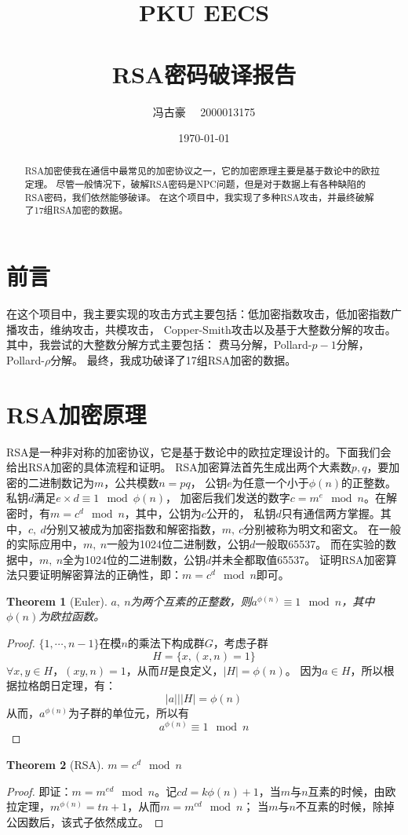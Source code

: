 \documentclass{ctexart}
\title{	
\normalfont \normalsize 
\textsc{PKU EECS} \\
\horrule{0.5pt} \\[0.4cm] 
\huge RSA密码破译报告
\horrule{2pt} \\[0.5cm] 
}
\author{冯古豪 \ \ 2000013175}
\date{\today}
\newtheorem{theorem}{Theorem}
\begin{document}
\maketitle
\newpage
\tableofcontents
\newpage

\begin{abstract}
    RSA加密使我在通信中最常见的加密协议之一，它的加密原理主要是基于数论中的欧拉定理。
    尽管一般情况下，破解RSA密码是NPC问题，但是对于数据上有各种缺陷的RSA密码，我们依然能够破译。
    在这个项目中，我实现了多种RSA攻击，并最终破解了17组RSA加密的数据。
\end{abstract}

\section{前言}\label{section-introduction}
在这个项目中，我主要实现的攻击方式主要包括：低加密指数攻击，低加密指数广播攻击，维纳攻击，共模攻击，
Copper-Smith攻击以及基于大整数分解的攻击。其中，我尝试的大整数分解方式主要包括：
费马分解，Pollard-$p-1$分解，Pollard-$\rho$分解。
最终，我成功破译了17组RSA加密的数据。
\section{RSA加密原理}
RSA是一种非对称的加密协议，它是基于数论中的欧拉定理设计的。下面我们会给出RSA加密的具体流程和证明。
RSA加密算法首先生成出两个大素数$p,q$，要加密的二进制数记为$m$，公共模数$n=pq$，
公钥$e$为任意一个小于$\phi(n)$的正整数。私钥$d$满足$e\times d\equiv 1 \mod{\phi(n)}$，
加密后我们发送的数字$c=m^e \mod n$。在解密时，有$m=c^d\mod n$，其中，公钥为$c$公开的，
私钥$d$只有通信两方掌握。其中，$c,\ d$分别又被成为加密指数和解密指数，$m,\ c$分别被称为明文和密文。
在一般的实际应用中，$m,\ n$一般为1024位二进制数，公钥$d$一般取65537。
而在实验的数据中，$m,\ n$全为1024位的二进制数，公钥$d$并未全都取值65537。
证明RSA加密算法只要证明解密算法的正确性，即：$m=c^d \mod n$即可。
\begin{theorem}[Euler]
    $a,\ n$为两个互素的正整数，则$a^{\phi(n)}\equiv 1\mod{n}$，其中$\phi(n)$为欧拉函数。
\end{theorem}
\begin{proof}
$\{1,\cdots,n-1\}$在模$n$的乘法下构成群$G$，考虑子群
$$
H=\{x,(x,n)=1\} 
$$
$\forall x,y\in H$，$(xy,n)=1$，从而$H$是良定义，$|H|=\phi(n)$。
因为$a\in H$，所以根据拉格朗日定理，有：
$$
|a| \vert|H|=\phi(n)
$$
从而，$a^{\phi(n)}$为子群的单位元，所以有
$$
a^{\phi(n)}\equiv 1\mod{n}
$$
\end{proof}
\begin{theorem}[RSA] 
    $m=c^d \mod n$
\end{theorem}
\begin{proof}
即证：$m=m^{ed}\mod n$。记$cd=k\phi(n)+1$，当$m$与$n$互素的时候，由欧拉定理，$m^{\phi(n)}=tn+1$，从而$m=m^{cd} \mod n$；
当$m$与$n$不互素的时候，除掉公因数后，该式子依然成立。
\end{proof}
\end{document}
